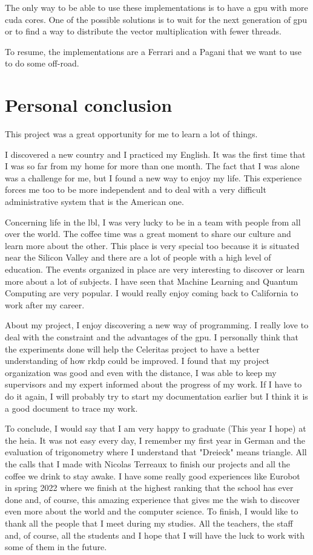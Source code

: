 The only way to be able to use these implementations is to have a \acrshort{gpu}
with more \acrshort{cuda} cores.
One of the possible solutions is to wait for the next generation of \acrshort{gpu} or
to find a way to distribute the vector multiplication with fewer threads.

To resume, the implementations are a Ferrari and a Pagani that we want to use to
do some off-road.

\section{Personal conclusion}
\label{ch:conclusion:personal}

This project was a great opportunity for me to learn a lot of things.

I discovered a new country and I practiced my English.
It was the first time that I was so far from my home for more than one month.
The fact that I was alone was a challenge for me, but I found a new way to enjoy
my life.
This experience forces me too to be more independent and to deal with a very
difficult administrative system that is the American one.

Concerning life in the \acrshort{lbl}, I was very lucky to be in a team with
people from all over the world.
The coffee time was a great moment to share our culture and learn more about
the other.
This place is very special too because it is situated near the Silicon Valley
and there are a lot of people with a high level of education.
The events organized in place are very interesting to discover or learn more
about a lot of subjects.
I have seen that Machine Learning and Quantum Computing are very
popular.
I would really enjoy coming back to California to work after my career.

About my project, I enjoy discovering a new way of programming.
I really love to deal with the constraint and the advantages of the \acrshort{gpu}.
I personally think that the experiments done will help the Celeritas project to
have a better understanding of how \acrshort{rkdp} could be improved.
I found that my project organization was good and even with the distance, I was
able to keep my supervisors and my expert informed about the progress of my work.
If I have to do it again, I will probably try to start my documentation earlier
but I think it is a good document to trace my work.

To conclude, I would say that I am very happy to graduate (This year I hope)
at the \acrshort{heia}.
It was not easy every day, I remember my first year in German and the evaluation
of trigonometry where I understand that "Dreieck" means triangle.
All the calls that I made with Nicolas Terreaux to finish our projects and all
the coffee we drink to stay awake.
I have some really good experiences like Eurobot in spring 2022 where we finish
at the highest ranking that the school has ever done and, of course, this
amazing experience that gives me the wish to discover even more about the world and
the computer science.
To finish, I would like to thank all the people that I meet during my studies.
All the teachers, the staff and, of course, all the students and I hope that I
will have the luck to work with some of them in the future.
